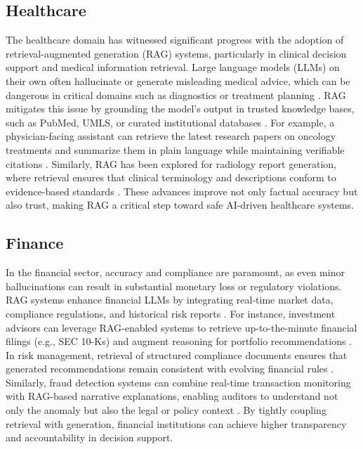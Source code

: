 \documentclass[conference]{IEEEtran}
\begin{document}
\subsection{Healthcare}
The healthcare domain has witnessed significant progress with the adoption of retrieval-augmented generation (RAG) systems, particularly in clinical decision support and medical information retrieval. Large language models (LLMs) on their own often hallucinate or generate misleading medical advice, which can be dangerous in critical domains such as diagnostics or treatment planning \cite{ji2023survey}. RAG mitigates this issue by grounding the model’s output in trusted knowledge bases, such as PubMed, UMLS, or curated institutional databases \cite{wang2023raghealth}. For example, a physician-facing assistant can retrieve the latest research papers on oncology treatments and summarize them in plain language while maintaining verifiable citations \cite{singhal2023medpalm}. Similarly, RAG has been explored for radiology report generation, where retrieval ensures that clinical terminology and descriptions conform to evidence-based standards \cite{wu2024clinicalrag}. These advances improve not only factual accuracy but also trust, making RAG a critical step toward safe AI-driven healthcare systems.

\subsection{Finance}
In the financial sector, accuracy and compliance are paramount, as even minor hallucinations can result in substantial monetary loss or regulatory violations. RAG systems enhance financial LLMs by integrating real-time market data, compliance regulations, and historical risk reports \cite{zhang2023finrag}. For instance, investment advisors can leverage RAG-enabled systems to retrieve up-to-the-minute financial filings (e.g., SEC 10-Ks) and augment reasoning for portfolio recommendations \cite{lin2023ragfin}. In risk management, retrieval of structured compliance documents ensures that generated recommendations remain consistent with evolving financial rules \cite{sun2023ragfin}. Similarly, fraud detection systems can combine real-time transaction monitoring with RAG-based narrative explanations, enabling auditors to understand not only the anomaly but also the legal or policy context \cite{chen2024ragfinance}. By tightly coupling retrieval with generation, financial institutions can achieve higher transparency and accountability in decision support.
\end{document}
